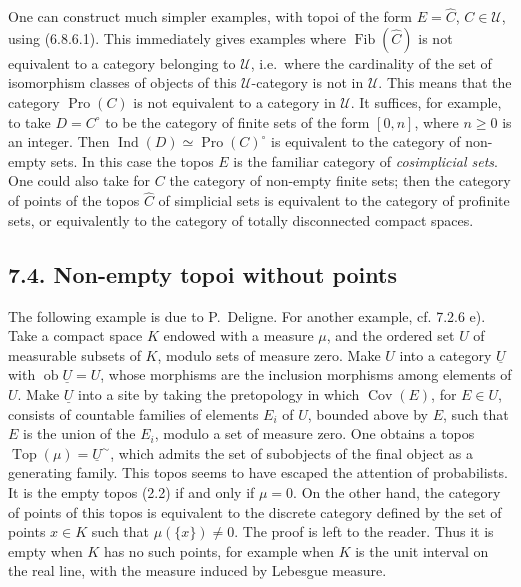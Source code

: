 \documentclass[11pt]{article}
\newcommand{\U}{\mathcal{U}}
\newcommand{\Top}{\operatorname{Top}}
\newcommand{\Cov}{\operatorname{Cov}}
\newcommand{\Ffib}{\operatorname{Fib}}
\newcommand{\ie}{i.e.}
\providecommand{\ob}{\operatorname{ob}}
\providecommand{\Pro}{\operatorname{Pro}}
\providecommand{\Ind}{\operatorname{Ind}}
\providecommand{\Cov}{\operatorname{Cov}}
\begin{document}
One can construct much simpler examples, with topoi of the form \(E=\widehat C\), \(C\in\U\), using (6.8.6.1). This immediately gives examples where \(\Ffib(\widehat C)\) is not equivalent to a category belonging to \(\U\), \ie\ where the cardinality of the set of isomorphism classes of objects of this \(\U\)-category is not in \(\U\). This means that the category \(\Pro(C)\) is not equivalent to a category in \(\U\). It suffices, for example, to take \(D=C^\circ\) to be the category of finite sets of the form \([0,n]\), where \(n\ge0\) is an integer. Then \(\Ind(D)\simeq\Pro(C)^\circ\) is equivalent to the category of non-empty sets. In this case the topos \(E\) is the familiar category of \emph{cosimplicial sets}. One could also take for \(C\) the category of non-empty finite sets; then the category of points of the topos \(\widehat C\) of simplicial sets is equivalent to the category of profinite sets, or equivalently to the category of totally disconnected compact spaces.

\subsection*{7.4. Non-empty topoi without points}

The following example is due to P.~Deligne. For another example, cf. 7.2.6 e). Take a compact space \(K\) endowed with a measure \(\mu\), and the ordered set \(U\) of measurable subsets of \(K\), modulo sets of measure zero. Make \(U\) into a category \(\underline U\) with \(\ob\underline U=U\), whose morphisms are the inclusion morphisms among elements of \(U\). Make \(\underline U\) into a site by taking the pretopology in which \(\Cov(E)\), for \(E\in U\), consists of countable families of elements \(E_i\) of \(U\), bounded above by \(E\), such that \(E\) is the union of the \(E_i\), modulo a set of measure zero. One obtains a topos \(\Top(\mu)=\underline U^{\sim}\), which admits the set of subobjects of the final object as a generating family. This topos seems to have escaped the attention of probabilists. It is the empty topos (2.2) if and only if \(\mu=0\). On the other hand, the category of points of this topos is equivalent to the discrete category defined by the set of points \(x\in K\) such that \(\mu(\{x\})\ne0\). The proof is left to the reader. Thus it is empty when \(K\) has no such points, for example when \(K\) is the unit interval on the real line, with the measure induced by Lebesgue measure.
\end{document}
